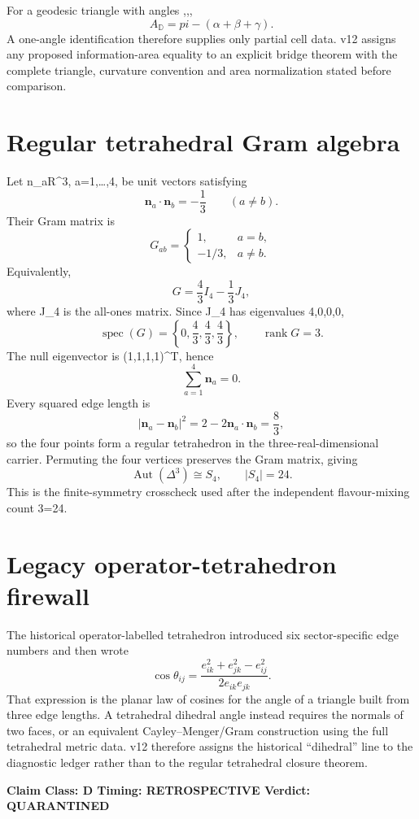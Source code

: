 \documentclass[11pt,a4paper,twoside]{book}
\def\({}%
\def\){}%
\def\pi{pi}%
\theoremstyle{definition}
\newcommand{\vTwelveStatus}[3]{\par\noindent\textbf{Claim Class: #1 \quad Timing: #2 \quad Verdict: #3}\par}
\begin{document}
For a geodesic triangle with angles \(\alpha,\beta,\gamma\),
\[
A_{\mathbb D}=\pi-(\alpha+\beta+\gamma).
\]
A one-angle identification therefore supplies only partial cell data.  v12
assigns any proposed information-area equality to an explicit bridge theorem
with the complete triangle, curvature convention and area normalization stated
before comparison.

\section{Regular tetrahedral Gram algebra}

Let \(\mathbf n_a\in\mathbb R^3\), \(a=1,\ldots,4\), be unit vectors satisfying
\[
\mathbf n_a\cdot\mathbf n_b=-\frac13\qquad(a\ne b).
\]
Their Gram matrix is
\[
G_{ab}=
\begin{cases}
1,&a=b,\\
-1/3,&a\ne b.
\end{cases}
\]
Equivalently,
\[
G=\frac43I_4-\frac13J_4,
\]
where \(J_4\) is the all-ones matrix.  Since \(J_4\) has eigenvalues \(4,0,0,0\),
\[
\operatorname{spec}(G)=\left\{0,\frac43,\frac43,\frac43\right\},
\qquad
\operatorname{rank}G=3.
\]
The null eigenvector is \((1,1,1,1)^T\), hence
\[
\sum_{a=1}^4\mathbf n_a=0.
\]
Every squared edge length is
\[
|\mathbf n_a-\mathbf n_b|^2
=2-2\mathbf n_a\cdot\mathbf n_b
=\frac83,
\]
so the four points form a regular tetrahedron in the three-real-dimensional
carrier.  Permuting the four vertices preserves the Gram matrix, giving
\[
\operatorname{Aut}(\Delta^3)\cong S_4,
\qquad |S_4|=24.
\]
This is the finite-symmetry crosscheck used after the independent
flavour-mixing count \(3=24\).

\section{Legacy operator-tetrahedron firewall}

The historical operator-labelled tetrahedron introduced six sector-specific
edge numbers and then wrote
\[
\cos\theta_{ij}
=
\frac{e_{ik}^2+e_{jk}^2-e_{ij}^2}{2e_{ik}e_{jk}}.
\]
That expression is the planar law of cosines for the angle of a triangle built
from three edge lengths.  A tetrahedral dihedral angle instead requires the
normals of two faces, or an equivalent Cayley--Menger/Gram construction using
the full tetrahedral metric data.  v12 therefore assigns the historical
``dihedral'' line to the diagnostic ledger rather than to the regular
tetrahedral closure theorem.
\vTwelveStatus{D}{RETROSPECTIVE}{QUARANTINED}
\end{document}

